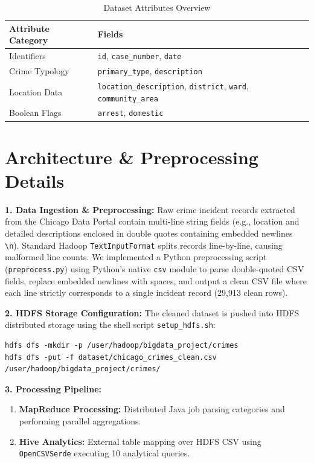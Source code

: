 \documentclass[12pt, a4paper]{article}
\begin{document}
\begin{table}[h]
    \centering
    \begin{tabular}{@{}ll@{}}
        \toprule
        \textbf{Attribute Category} & \textbf{Fields} \\ \midrule
        Identifiers & \texttt{id}, \texttt{case\_number}, \texttt{date} \\
        Crime Typology & \texttt{primary\_type}, \texttt{description} \\
        Location Data & \texttt{location\_description}, \texttt{district}, \texttt{ward}, \texttt{community\_area} \\
        Boolean Flags & \texttt{arrest}, \texttt{domestic} \\ \bottomrule
    \end{tabular}
    \caption{Dataset Attributes Overview}
\end{table}

\section{Architecture \& Preprocessing Details}
\textbf{1. Data Ingestion \& Preprocessing:}
Raw crime incident records extracted from the Chicago Data Portal contain multi-line string fields (e.g., location and detailed descriptions enclosed in double quotes containing embedded newlines \texttt{\textbackslash n}). Standard Hadoop \texttt{TextInputFormat} splits records line-by-line, causing malformed line counts.
We implemented a Python preprocessing script (\texttt{preprocess.py}) using Python's native \texttt{csv} module to parse double-quoted CSV fields, replace embedded newlines with spaces, and output a clean CSV file where each line strictly corresponds to a single incident record (29,913 clean rows).

\textbf{2. HDFS Storage Configuration:}
The cleaned dataset is pushed into HDFS distributed storage using the shell script \texttt{setup\_hdfs.sh}:
\begin{lstlisting}
hdfs dfs -mkdir -p /user/hadoop/bigdata_project/crimes
hdfs dfs -put -f dataset/chicago_crimes_clean.csv /user/hadoop/bigdata_project/crimes/
\end{lstlisting}

\textbf{3. Processing Pipeline:}
\begin{enumerate}
    \item \textbf{MapReduce Processing:} Distributed Java job parsing categories and performing parallel aggregations.
    \item \textbf{Hive Analytics:} External table mapping over HDFS CSV using \texttt{OpenCSVSerde} executing 10 analytical queries.
\end{enumerate}
\end{document}
